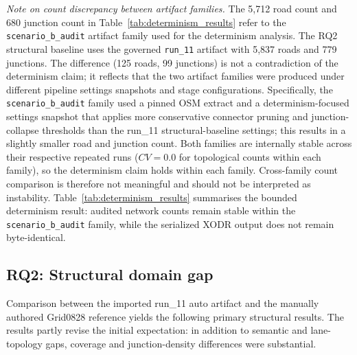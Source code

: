 \noindent\textit{Note on count discrepancy between artifact families.} The 5,712 road count and 680 junction count in Table~\ref{tab:determinism_results} refer to the \texttt{scenario\_b\_audit} artifact family used for the determinism analysis. The RQ2 structural baseline uses the governed \texttt{run\_11} artifact with 5,837 roads and 779 junctions. The difference (125 roads, 99 junctions) is not a contradiction of the determinism claim; it reflects that the two artifact families were produced under different pipeline settings snapshots and stage configurations. Specifically, the \texttt{scenario\_b\_audit} family used a pinned OSM extract and a determinism-focused settings snapshot that applies more conservative connector pruning and junction-collapse thresholds than the run\_11 structural-baseline settings; this results in a slightly smaller road and junction count. Both families are internally stable across their respective repeated runs ($CV=0.0$ for topological counts within each family), so the determinism claim holds within each family. Cross-family count comparison is therefore not meaningful and should not be interpreted as instability. Table~\ref{tab:determinism_results} summarises the bounded determinism result: audited network counts remain stable within the \texttt{scenario\_b\_audit} family, while the serialized XODR output does not remain byte-identical.

\subsection{RQ2: Structural domain gap}
Comparison between the imported run\_11 auto artifact and the manually authored Grid0828 reference yields the following primary structural results. The results partly revise the initial expectation: in addition to semantic and lane-topology gaps, coverage and junction-density differences were substantial.

